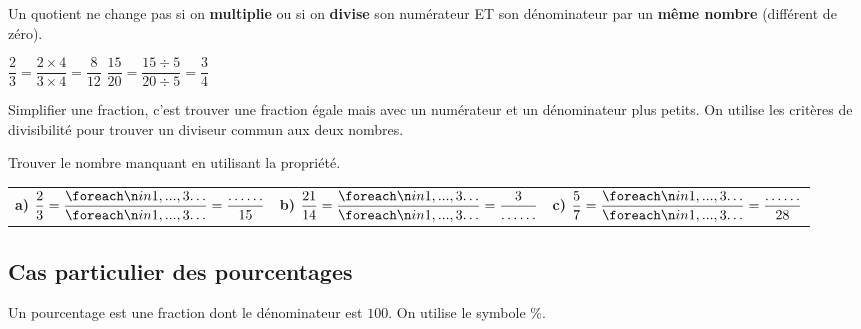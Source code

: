 \documentclass[a4paper]{book}
\begin{document}
    \begin{propriete}
        Un quotient ne change pas si on \textbf{multiplie} ou si on \textbf{divise} son numérateur ET son dénominateur par un \textbf{même nombre} (différent de zéro).
    \end{propriete}
    
    
    \begin{exemple}
        $\dfrac{2}{3} = \dfrac{2 \times 4}{3 \times 4} = \dfrac{8}{12}$ \hspace{2cm} $\dfrac{15}{20} = \dfrac{15 \div 5}{20 \div 5} = \dfrac{3}{4}$
    \end{exemple}
    
    
    \begin{methode}
        Simplifier une fraction, c'est trouver une fraction égale mais avec un numérateur et un dénominateur plus petits. On utilise les critères de divisibilité pour trouver un diviseur commun aux deux nombres.
    \end{methode}


    \begin{exemple}
        Trouver le nombre manquant en utilisant la propriété.
        \begin{center}
            \renewcommand{\arraystretch}{3} %
            \begin{tabularx}{\textwidth}{XXX}
                \textbf{a)} $\dfrac{2}{3} = \dfrac{\points[3]}{\points[3]} = \dfrac{\dots\dots}{15}$ & 
                \textbf{b)} $\dfrac{21}{14} = \dfrac{\points[3]}{\points[3]} = \dfrac{3}{\dots\dots}$ & 
                \textbf{c)} $\dfrac{5}{7} = \dfrac{\points[3]}{\points[3]} = \dfrac{\dots\dots}{28}$ \\
            \end{tabularx}
        \end{center}
    \end{exemple}
    
    
\subsection{Cas particulier des pourcentages}

    \begin{definition}[Pourcentage]
        Un pourcentage est une fraction dont le dénominateur est $100$. On utilise le symbole $\%$.
    \end{definition}
    
\end{document}
